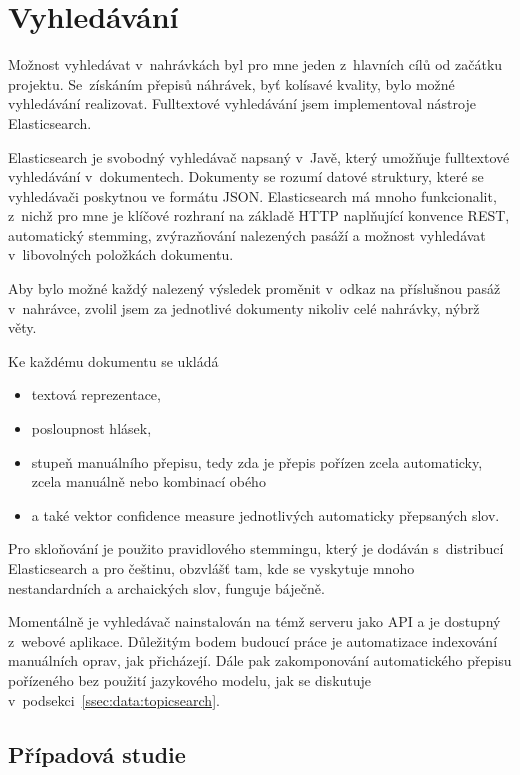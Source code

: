 \chapter{Vyhledávání}
\label{kap:vyhledavani}

Možnost vyhledávat v~nahrávkách byl pro mne jeden z~hlavních cílů od začátku
projektu. Se~získáním přepisů náhrávek, byť kolísavé kvality, bylo možné
vyhledávání realizovat.
Fulltextové vyhledávání jsem implementoval nástroje Elasticsearch.

Elasticsearch je svobodný vyhledávač napsaný v~Javě, který umožňuje fulltextové
vyhledávání v~dokumentech. Dokumenty se rozumí datové struktury, které se
vyhledávači poskytnou ve formátu JSON. Elasticsearch má mnoho funkcionalit,
z~nichž pro mne je klíčové rozhraní na základě HTTP naplňující konvence REST,
automatický stemming, zvýrazňování nalezených pasáží a možnost vyhledávat
v~libovolných položkách dokumentu.

Aby bylo možné každý nalezený výsledek proměnit v~odkaz na příslušnou pasáž
v~nahrávce, zvolil jsem za jednotlivé dokumenty nikoliv celé nahrávky, nýbrž
věty.

Ke každému dokumentu se ukládá
\begin{itemize}
\item{textová reprezentace,}
\item{posloupnost hlásek,}
\item{stupeň
manuálního přepisu, tedy zda je přepis pořízen zcela automaticky, zcela manuálně
nebo kombinací obého}
\item{a také vektor confidence measure jednotlivých automaticky přepsaných slov.}
\end{itemize}

Pro skloňování je použito pravidlového stemmingu, který je dodáván s~distribucí
Elasticsearch a pro češtinu, obzvlášť tam, kde se vyskytuje mnoho
nestandardních a archaických slov, funguje báječně.

Momentálně je vyhledávač nainstalován na témž serveru jako API a je dostupný
z~webové aplikace. Důležitým bodem budoucí práce je automatizace indexování
manuálních oprav, jak přicházejí. Dále pak zakomponování automatického přepisu
pořízeného bez použití jazykového modelu, jak se diskutuje
v~podsekci~\ref{ssec:data:topicsearch}.

\section{Případová studie}

